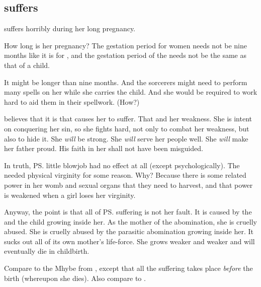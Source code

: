 \subsection{\Ilu{} suffers}
\Ilu{} suffers horribly during her long pregnancy. 

How long is her pregnancy? The gestation period for \nephil{} women needs not be nine months like it is for \humans, and the gestation period of the \banemessiah{} needs not be the same as that of a \nephil{} child. 

It might be longer than nine months. And the sorcerers might need to perform many spells on her while she carries the child. And she would be required to work hard to aid them in their spellwork. (How?) 

\Ilu{} believes that it is  that causes her to suffer. That and her weakness. She is intent on conquering her sin, so she fights hard, not only to combat her weakness, but also to hide it. She \emph{will} be strong. She \emph{will} serve her people well. She \emph{will} make her father proud. His faith in her shall not have been misguided. 

In truth, \ps{\Ilu}{} little blowjob had no effect at all (except psychologically). The \banes{} needed physical virginity for some reason. Why? Because there is some  related power in her womb and sexual organs that they need to harvest, and that power is weakened when a girl loses her virginity. 

Anyway, the point is that all of \ps{\Ilu}{} suffering is not her fault. It is caused by the \banes{} and the \halfbane{} child growing inside her. 
As the mother of the \erebean{} abomination, she is cruelly abused. 
She is cruelly abused by the parasitic abomination growing inside her. It sucks out all of its own mother's life-force. She grows weaker and weaker and will eventually die in childbirth. 


Compare to the Mhybe from \cite{StevenErikson:MemoriesofIce}, except that all the suffering takes place \emph{before} the birth (whereupon she dies). Also compare to . 

